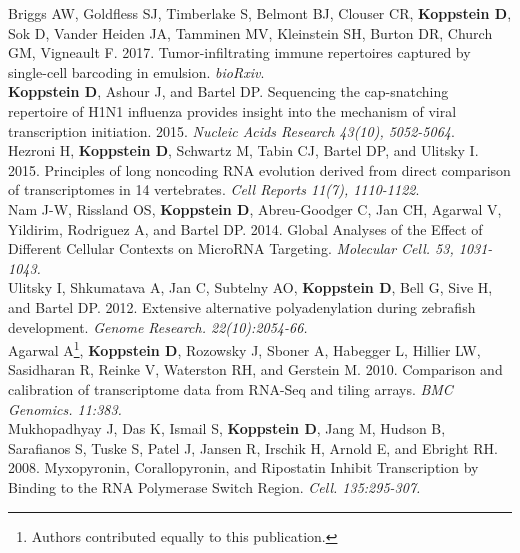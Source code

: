 \documentclass[10pt,a4paper]{article}
\begin{document}
{{{{{\noindent Briggs AW, Goldfless SJ, Timberlake S, Belmont BJ, Clouser CR, \textbf{Koppstein D}, Sok D, Vander Heiden JA, Tamminen MV, Kleinstein SH, Burton DR, Church GM, Vigneault F. 2017. Tumor-infiltrating immune repertoires captured by single-cell barcoding in emulsion. \textit{bioRxiv}. \vspace{0.5em} \\
{\noindent \textbf{Koppstein D}, Ashour J, and Bartel DP. Sequencing the cap-snatching repertoire of H1N1
influenza provides insight into the mechanism of viral transcription initiation. 2015. \textit{Nucleic Acids Research 43(10), 5052-5064}.} \vspace{0.5em} \\
{\noindent Hezroni H, \textbf{Koppstein D}, Schwartz M, Tabin CJ, Bartel DP, and Ulitsky I. 2015. Principles of long noncoding
RNA evolution derived from direct comparison of transcriptomes in 14 vertebrates. \textit{Cell Reports 11(7), 1110-1122}}. \vspace{0.5em} \\
{\noindent Nam J-W, Rissland OS, \textbf{Koppstein D}, Abreu-Goodger C, Jan CH, Agarwal V, Yildirim, Rodriguez A, and Bartel DP. 2014. Global Analyses of the Effect of Different Cellular Contexts on MicroRNA Targeting. \textit{Molecular Cell. 53, 1031-1043.}} \vspace{0.5em} \\
{\noindent Ulitsky I, Shkumatava A, Jan C, Subtelny AO, \textbf{Koppstein D}, Bell G, Sive H, and Bartel DP. 2012. Extensive alternative polyadenylation during zebrafish development. \textit{Genome Research. 22(10):2054-66.}} \vspace{0.5em} \\
{\noindent Agarwal A\footnote[1]{Authors contributed equally to this publication.}, \textbf{Koppstein D}\footnotemark[1], Rozowsky J, Sboner A, Habegger L, Hillier LW, Sasidharan R, Reinke V, Waterston RH, and Gerstein M. 2010. Comparison and calibration of transcriptome data from RNA-Seq and tiling arrays. \textit{BMC Genomics. 11:383.}} \vspace{0.3em} \\
{\noindent Mukhopadhyay J, Das K, Ismail S, \textbf{Koppstein D}, Jang M, Hudson B, Sarafianos S, Tuske S, Patel J, Jansen R, Irschik H, Arnold E, and Ebright RH. 2008. Myxopyronin, Corallopyronin, and Ripostatin Inhibit Transcription by Binding to the RNA Polymerase Switch Region. \textit{Cell. 135:295-307.}} \vspace{0.3em} \\

}}}}}
\end{document}
